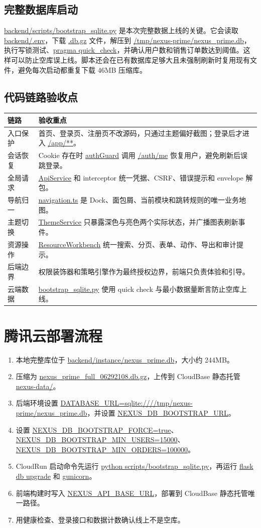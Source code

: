 \documentclass[UTF8,zihao=-4]{ctexart}
\newcommand{\code}[1]{{\small\url{#1}}}
\begin{document}
\subsection{完整数据库启动}
\code{backend/scripts/bootstrap_sqlite.py} 是本次完整数据上线的关键。它会读取 \code{backend/.env}，下载 \code{.db.gz} 文件，解压到 \code{/tmp/nexus-prime/nexus_prime.db}，执行写锁测试、\code{pragma quick_check}，并确认用户数和销售订单数达到阈值。这样可以防止空库误上线。脚本还会在已有数据库足够大且未强制刷新时复用现有文件，避免每次启动都重复下载 46MB 压缩库。

\subsection{代码链路验收点}
\begin{longtable}{p{}p{}}
\toprule
链路 & 验收重点 \\
\midrule
\endhead
入口保护 & 首页、登录页、注册页不改源码，只通过主题偏好截图；登录后才进入 \code{/app/**}。 \\
会话恢复 & Cookie 存在时 \code{authGuard} 调用 \code{/auth/me} 恢复用户，避免刷新后误跳登录。 \\
全局请求 & \code{ApiService} 和 interceptor 统一凭据、CSRF、错误提示和 envelope 解包。 \\
导航归一 & \code{navigation.ts} 是 Dock、面包屑、当前模块和跳转规则的唯一业务地图。 \\
主题切换 & \code{ThemeService} 只暴露深色与亮色两个实际状态，并广播图表刷新事件。 \\
资源操作 & \code{ResourceWorkbench} 统一搜索、分页、表单、动作、导出和审计提示。 \\
后端边界 & 权限装饰器和策略引擎作为最终授权边界，前端只负责体验和引导。 \\
云端数据 & \code{bootstrap_sqlite.py} 使用 quick check 与最小数据量断言防止空库上线。 \\
\bottomrule
\end{longtable}
\clearpage
\section{腾讯云部署流程}
\begin{enumerate}
  \item 本地完整库位于 \code{backend/instance/nexus_prime.db}，大小约 244MB。
  \item 压缩为 \code{nexus_prime_full_06292108.db.gz}，上传到 CloudBase 静态托管 \code{nexus-data/}。
  \item 后端环境设置 \code{DATABASE_URL=sqlite:////tmp/nexus-prime/nexus_prime.db}，并设置 \code{NEXUS_DB_BOOTSTRAP_URL}。
  \item 设置 \code{NEXUS_DB_BOOTSTRAP_FORCE=true}、\code{NEXUS_DB_BOOTSTRAP_MIN_USERS=15000}、\code{NEXUS_DB_BOOTSTRAP_MIN_ORDERS=100000}。
  \item CloudRun 启动命令先运行 \code{python scripts/bootstrap_sqlite.py}，再运行 \code{flask db upgrade} 和 \code{gunicorn}。
  \item 前端构建时写入 \code{NEXUS_API_BASE_URL}，部署到 CloudBase 静态托管唯一路径。
  \item 用健康检查、登录接口和数据计数确认线上不是空库。
\end{enumerate}
\end{document}
